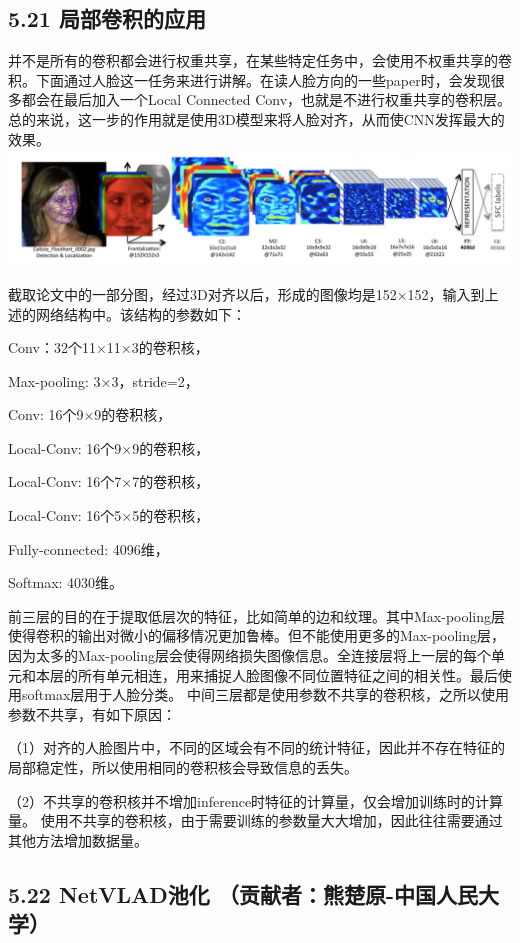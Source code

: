 \subsection{5.21
局部卷积的应用}\label{ux5c40ux90e8ux5377ux79efux7684ux5e94ux7528}

并不是所有的卷积都会进行权重共享，在某些特定任务中，会使用不权重共享的卷积。下面通过人脸这一任务来进行讲解。在读人脸方向的一些paper时，会发现很多都会在最后加入一个Local
Connected
Conv，也就是不进行权重共享的卷积层。总的来说，这一步的作用就是使用3D模型来将人脸对齐，从而使CNN发挥最大的效果。
\includegraphics{./img/ch5/img66.png}

截取论文中的一部分图，经过3D对齐以后，形成的图像均是152×152，输入到上述的网络结构中。该结构的参数如下：

Conv：32个11×11×3的卷积核，

Max-pooling: 3×3，stride=2，

Conv: 16个9×9的卷积核，

Local-Conv: 16个9×9的卷积核，

Local-Conv: 16个7×7的卷积核，

Local-Conv: 16个5×5的卷积核，

Fully-connected: 4096维，

Softmax: 4030维。

前三层的目的在于提取低层次的特征，比如简单的边和纹理。其中Max-pooling层使得卷积的输出对微小的偏移情况更加鲁棒。但不能使用更多的Max-pooling层，因为太多的Max-pooling层会使得网络损失图像信息。全连接层将上一层的每个单元和本层的所有单元相连，用来捕捉人脸图像不同位置特征之间的相关性。最后使用softmax层用于人脸分类。
中间三层都是使用参数不共享的卷积核，之所以使用参数不共享，有如下原因：

（1）对齐的人脸图片中，不同的区域会有不同的统计特征，因此并不存在特征的局部稳定性，所以使用相同的卷积核会导致信息的丢失。

（2）不共享的卷积核并不增加inference时特征的计算量，仅会增加训练时的计算量。
使用不共享的卷积核，由于需要训练的参数量大大增加，因此往往需要通过其他方法增加数据量。

\subsection{5.22 NetVLAD池化
（贡献者：熊楚原-中国人民大学）}\label{netvladux6c60ux5316-ux8d21ux732eux8005ux718aux695aux539f-ux4e2dux56fdux4ebaux6c11ux5927ux5b66}

